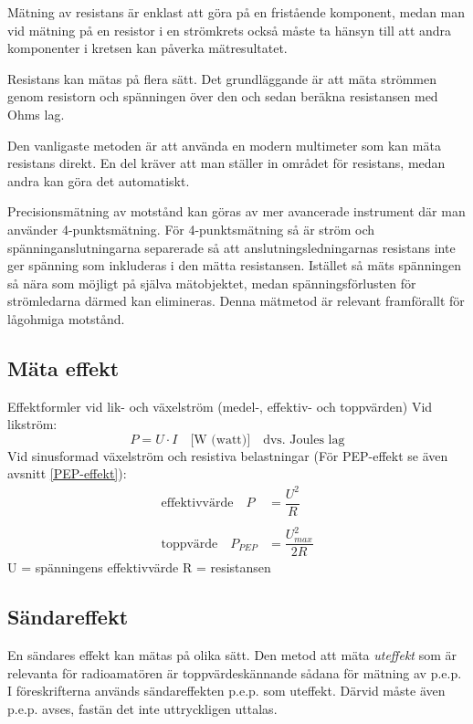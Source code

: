 Mätning av resistans är enklast att göra på en fristående komponent,
medan man vid mätning på en resistor i en strömkrets också måste ta
hänsyn till att andra komponenter i kretsen kan påverka mätresultatet.

Resistans kan mätas på flera sätt.
Det grundläggande är att mäta strömmen genom resistorn och spänningen över den
och sedan beräkna resistansen med Ohms lag.

Den vanligaste metoden är att använda en modern multimeter som kan mäta
resistans direkt.
En del kräver att man ställer in området för resistans, medan andra
kan göra det automatiskt.

Precisionsmätning av motstånd kan göras av mer avancerade instrument
där man använder 4-punkts\-mätning.
För 4-punktsmätning så är ström och spänninganslutningarna separerade
så att anslutningsledningarnas resistans inte ger spänning som inkluderas
i den mätta resistansen.
Istället så mäts spänningen så nära som möjligt på själva mätobjektet,
medan spänningsförlusten för strömledarna därmed kan elimineras.
Denna mätmetod är relevant framförallt för lågohmiga motstånd.

\subsection{Mäta effekt}
\label{mätaeffekt}

Effektformler vid lik- och växelström (medel-, effektiv- och toppvärden)
Vid likström:
%
\[
P = U \cdot I \quad \text{[W (watt)]} \quad \text{dvs. Joules lag}
\]
Vid sinusformad växelström och resistiva belastningar
(För PEP-effekt se även avsnitt \ref{PEP-effekt}):
\[
\begin{array}{ll}
\text{effektivvärde} \quad P & = \dfrac{U^2}{R} \\
&\\
\text{toppvärde}     \quad P_{PEP} & = \dfrac{U_{max}^2}{2R}
\end{array}
\]
U = spänningens effektivvärde
R = resistansen

\subsection{Sändareffekt}

En sändares effekt kan mätas på olika sätt.
Den metod att mäta \emph{uteffekt} som är relevanta för radioamatören är
toppvärdeskännande sådana för mätning av p.e.p.
I föreskrifterna används sändareffekten p.e.p. som uteffekt.
Därvid måste även p.e.p. avses, fastän det inte uttryckligen uttalas.

